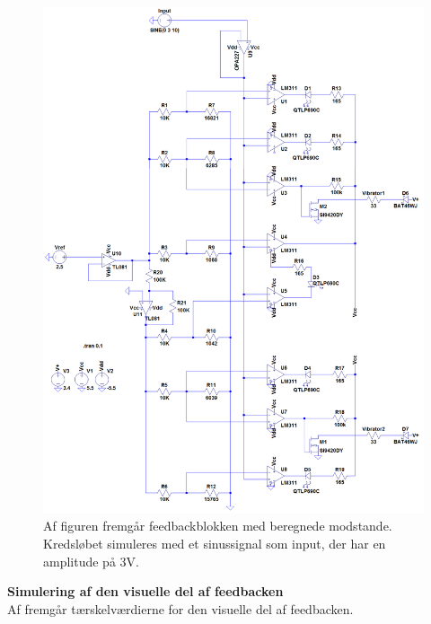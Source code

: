 \begin{figure}[H]
	\centering
	\includegraphics[scale=0.32]{figures/cProblemloesning/komparator_samlet.PNG}
	\caption{Af figuren fremgår feedbackblokken med beregnede modstande. Kredsløbet simuleres med et sinussignal som input, der har en amplitude på $3$V.}
	\label{fig:komparator_samlet}
\end{figure}
 
\noindent\textbf{Simulering af den visuelle del af feedbacken} \\
Af  fremgår tærskelværdierne for den visuelle del af feedbacken. 

